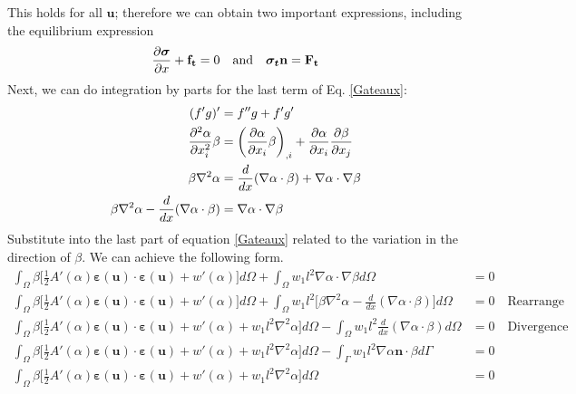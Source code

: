 \documentclass[12pt,3p]{article}
\numberwithin{equation}{section}
\begin{document}
This holds for all $\mathbf{u}$; therefore we can obtain two important expressions, including the equilibrium expression
\begin{equation}
\pdv{\boldsymbol{\sigma}}{x} + \mathbf{f_t} = 0 \quad \text{and} \quad \boldsymbol{\sigma_t} \mathbf{n} = \mathbf{F_t}
\end{equation}
Next, we can do integration by parts for the last term of Eq. \ref{Gateaux}:
\begin{align*}
(f'g)'&= f''g + f' g' \\
\pdv[2]{\alpha}{x_i} \beta &= \bigg( \pdv{\alpha}{x_i} \beta \bigg)_{,i} + \pdv{\alpha}{x_i} \pdv{\beta}{x_j} \\
\beta \nabla^2 \alpha &= \frac{d}{dx} (\nabla \alpha \cdot \beta)+ \nabla \alpha \cdot \nabla \beta \\
\beta \nabla^2 \alpha - \frac{d}{dx} (\nabla \alpha \cdot \beta) &= \nabla \alpha \cdot \nabla \beta 
\end{align*}
Substitute into the last part of equation \ref{Gateaux} related to the variation in the direction of $\beta$. We can achieve the following form. 
\begin{align*}
\int_{\Omega} \beta \bigg[ \frac{1}{2} A'(\alpha) \boldsymbol{\varepsilon} (\mathbf{u}) \cdot \boldsymbol{\varepsilon} (\mathbf{u}) + w'(\alpha) \bigg] d \Omega + \int_{\Omega} w_1 l^2 \nabla \alpha \cdot \nabla \beta d \Omega &= 0 \\
\int_{\Omega} \beta \bigg[ \frac{1}{2} A'(\alpha) \boldsymbol{\varepsilon} (\mathbf{u}) \cdot \boldsymbol{\varepsilon} (\mathbf{u}) + w'(\alpha) \bigg] d \Omega + \int_{\Omega} w_1 l^2 \bigg[ \beta \nabla^2 \alpha - \frac{d}{dx} (\nabla \alpha \cdot \beta) \bigg] d \Omega &= 0 \quad \text{Rearrange} \\ 
\int_{\Omega} \beta \bigg[ \frac{1}{2} A'(\alpha) \boldsymbol{\varepsilon} (\mathbf{u}) \cdot \boldsymbol{\varepsilon} (\mathbf{u}) + w'(\alpha) + w_1 l^2 \nabla^2 \alpha \bigg] d \Omega - \int_{\Omega} w_1 l^2 \frac{d}{dx} (\nabla \alpha \cdot \beta) d \Omega &= 0 \quad \text{Divergence} \\
\int_{\Omega} \beta \bigg[ \frac{1}{2} A'(\alpha) \boldsymbol{\varepsilon} (\mathbf{u}) \cdot \boldsymbol{\varepsilon} (\mathbf{u}) + w'(\alpha) + w_1 l^2 \nabla^2 \alpha \bigg] d \Omega - \int_{\Gamma} w_1 l^2 \nabla \alpha \mathbf{n} \cdot \beta d \Gamma &= 0 \\
\int_{\Omega} \beta \bigg[ \frac{1}{2} A'(\alpha) \boldsymbol{\varepsilon} (\mathbf{u}) \cdot \boldsymbol{\varepsilon} (\mathbf{u}) + w'(\alpha) + w_1 l^2 \nabla^2 \alpha \bigg] d \Omega &= 0 
\end{align*}
\end{document}
